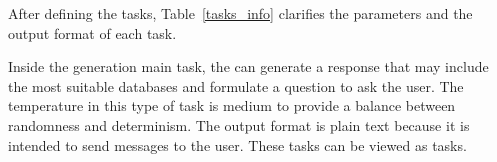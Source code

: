 After defining the tasks, Table~\ref{tasks_info} clarifies the parameters and the output format of each task.


\begin{table}[H]
  \centering
  \def\arraystretch{1.2}
  \caption[Large Language Model parameters and output information]{LLM parameters and output information.}
  \label{tasks_info}
\end{table}

Inside the generation main task, the {\llm} can generate a response that may include the most suitable databases and formulate a question to ask the user. The temperature in this type of task is medium to provide a balance between randomness and determinism. The output format is plain text because it is intended to send messages to the user. These tasks can be viewed as {\nlg} tasks.

